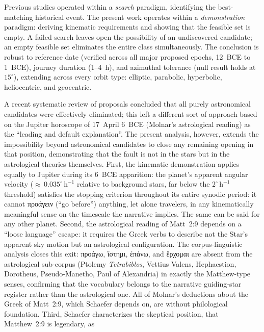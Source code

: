 \documentclass[sn-nature]{sn-jnl}
\newcommand{\grk}[1]{{\fontencoding{LGR}\selectfont #1}}
\newcommand{\grk}[1]{{\greekfont #1}}
\begin{document}
Previous studies operated within a \emph{search} paradigm, identifying the
best-matching historical event. The present work operates within a
\emph{demonstration} paradigm: deriving kinematic requirements and showing that the
feasible set is empty. A failed search leaves open the possibility of an
undiscovered candidate; an empty feasible set eliminates the entire class
simultaneously. The conclusion is robust to reference date (verified across all
major proposed epochs, 12~BCE to 1~BCE), journey duration (1--4~h), and
azimuthal tolerance (null result holds at $15^\circ$), extending across every
orbit type: elliptic, parabolic, hyperbolic, heliocentric, and geocentric.

A recent systematic review of proposals concluded that all purely
astronomical candidates were effectively eliminated; this left a different sort of approach based
on the Jupiter horoscope of 17~April 6~BCE (Molnar's astrological reading) as the ``leading and default
explanation''\cite{schaefer2015,schaefer2015molnar}. The present analysis, however,
extends the impossibility beyond astronomical candidates to close any remaining
opening in that position, demonstrating that the fault is not in the stars but in the astrological theories themselves.
First, the kinematic demonstration applies equally to Jupiter during its
6~BCE apparition: the planet's apparent angular velocity (${\approx}\,0.035^\circ\,\mathrm{h}^{-1}$
relative to background stars, far below the $2^\circ\,\mathrm{h}^{-1}$ threshold)
satisfies the stopping criterion throughout its entire synodic period: it
cannot \grk{προάγειν} (``go before'') anything, let alone travelers, in any kinematically
meaningful sense on the timescale the narrative implies. The same can be said for any other planet. 
Second, the astrological reading of Matt~2:9 depends on a ``loose language''
escape: it requires the Greek verbs to describe not the Star's apparent sky
motion but an astrological configuration.
The corpus-linguistic analysis closes this exit: \grk{προάγω}, \grk{ἵστημι},
\grk{ἐπάνω}, and \grk{ἔρχομαι} are absent from the astrological sub-corpus
(Ptolemy \textit{Tetrabiblos}, Vettius Valens, Hephaestion, Dorotheus,
Pseudo-Manetho, Paul of Alexandria) in exactly the Matthew-type senses,
confirming that the vocabulary belongs to the narrative guiding-star register
rather than the astrological one. All of Molnar's deductions about the Greek of Matt~2:9, 
which Schaefer depends on, are without philological foundation\cite{birdsall2002,heilen2015,adair2013star}. 
Third, Schaefer characterizes the skeptical position, that Matthew~2:9 is legendary, as
\end{document}
